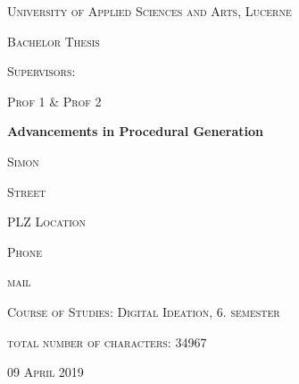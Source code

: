 \begin{titlepage}
\centering
\vspace{1cm}
	{\scshape\LARGE University of Applied Sciences and Arts, Lucerne \par}
	\vspace{0.5cm}
	{\scshape\Large Bachelor Thesis \par}
	\vspace{1cm}
	{\scshape\Large Supervisors: \par}
	{\scshape\Large Prof 1 \& Prof 2\par}
	\vspace{1.5cm}
	{\huge\bf Advancements in Procedural Generation \par}
	
	\vspace{4cm}
	{\scshape\Large Simon \par}
	{\scshape\Large Street\par}
	{\scshape\Large PLZ Location\par}
	{\scshape\Large Phone\par}
	{\scshape\Large mail \par}
	\vspace{2cm}
	{\scshape\Large Course of Studies: Digital Ideation, 6. semester \par}
	{\scshape\Large total number of characters: 34967 \par}
	\vfill

	{\scshape\large 09 April 2019\par}
\end{titlepage}